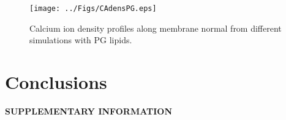 \documentclass[aps,prl,superscriptaddress,twocolumn]{revtex4}
\begin{document}
\begin{figure}[]
  \centering
  \texttt{[image: ../Figs/CAdensPG.eps]}
  \caption{\label{CAdensPG}
    Calcium ion density profiles along membrane normal
    from different simulations with PG lipids.
  }
\end{figure}





\section{Conclusions}


%

\begin{acknowledgments}
\end{acknowledgments}
\newpage
\appendix
\begin{center}
{\bf SUPPLEMENTARY INFORMATION}
\end{center}



\end{document}
